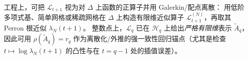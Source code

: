 \begin{remark}\label{rem:pom-projective-pressure-numerics}
工程上，可把 \(\mathcal{L}_{t+1}\) 视为对 \(\Delta\) 上函数的正算子并用 Galerkin/配点离散：
用低阶多项式基、简单网格或稀疏网格在 \(\Delta\) 上构造有限维近似算子 \(\mathcal{L}_{t+1}^{(N)}\)，再取其 Perron 根近似 \(\lambda_N(t+1)\)。
整数点上，\(\mathcal{L}_{q}\) 已在 \(\mathcal{H}_q\) 上给出\emph{严格有限维}表示 \(\widetilde A_q\)，因此可用 \(\rho(\widetilde A_q)=r_q\) 作为离散化/外推的强一致性回归锚点（尤其是检查 \(t\mapsto \log\lambda_N(t+1)\) 的凸性与在 \(t=q-1\) 处的插值误差）。
\end{remark}
